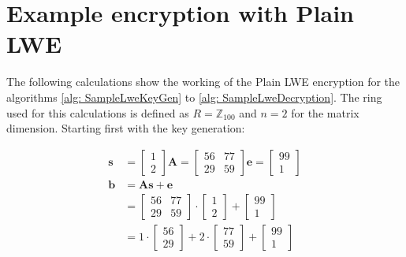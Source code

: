 \section{Example encryption with Plain LWE}
\label{app:PlainLweCalc}
The following calculations show the working of the Plain LWE encryption for the algorithms \ref{alg: SampleLweKeyGen} to \ref{alg: SampleLweDecryption}. The ring used for this calculations is defined as $R=\mathbb{Z}_{100}$ and $n=2$ for the matrix dimension. Starting first with the key generation:


\begin{align*}
  \textbf{s} & = \begin{bmatrix}1 \\ 2 \end{bmatrix}
  \textbf{A}  = \begin{bmatrix}56 & 77 \\ 29 & 59 \end{bmatrix}
  \textbf{e}  = \begin{bmatrix}99 \\ 1 \end{bmatrix}               \\
  \textbf{b} & = \textbf{A}\textbf{s} +\textbf{e}                  \\
             & = \begin{bmatrix}
                   56 & 77  \\
                   29 & 59
                 \end{bmatrix}
  \cdot
  \begin{bmatrix}
    1 \\
    2
  \end{bmatrix}
  +
  \begin{bmatrix}
    99 \\ 
    1 
  \end{bmatrix}
  \\
             & = 1
  \cdot
  \begin{bmatrix}
    56 \\
    29
  \end{bmatrix}
  + 2 
  \cdot
  \begin{bmatrix}
    77 \\ 
    59 
  \end{bmatrix}
  + 
  \begin{bmatrix}
    99 \\ 
    1 
  \end{bmatrix}                                                  \\

\end{align*}
